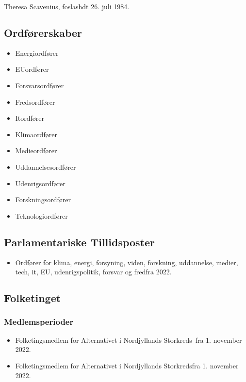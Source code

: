 \documentclass[11pt, a4paper]{awesome-cv}
\begin{document}
\makecvheader[R]
\makelettertitle
\begin{cvletter}
Theresa Scavenius, foslashdt 26. juli 1984.

\subsection*{Ordførerskaber}
\begin{itemize}
\item Energiordfører
\item EUordfører
\item Forsvarsordfører
\item Fredsordfører
\item Itordfører
\item Klimaordfører
\item Medieordfører
\item Uddannelsesordfører
\item Udenrigsordfører
\item Forskningsordfører
\item Teknologiordfører
\end{itemize}
\subsection*{Parlamentariske Tillidsposter}
\begin{itemize}
\item Ordfører for klima, energi, forsyning, viden, forskning, uddannelse, medier, tech, it, EU, udenrigspolitik, forsvar og fredfra 2022.
\end{itemize}
\subsection*{Folketinget}
\subsubsection*{Medlemsperioder}
\begin{itemize}
\item Folketingsmedlem for Alternativet i Nordjyllands Storkreds fra 1. november 2022.
\item Folketingsmedlem for Alternativet i Nordjyllands Storkredsfra 1. november 2022.
\end{itemize}
\end{cvletter}
\end{document}
